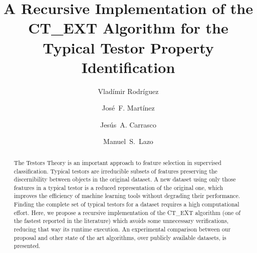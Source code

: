 \documentclass[citeauthoryear]{llncs}
\begin{document}
\mainmatter              %
%
\title{A Recursive Implementation of the CT\_EXT Algorithm 
	   for the Typical Testor Property Identification}
%
			 
\author{Vlad\'{i}mir Rodr\'{i}guez \and Jos\'{e}~F. Mart\'{i}nez
		 \and Jes\'{u}s~A. Carrasco \and Manuel~S.~Lazo}
%
%
%


\maketitle              %

\begin{abstract}
	The Testors Theory is an important approach to feature selection 
	in supervised classification. Typical testors are irreducible subsets 
	of features preserving the discernibility between objects in the 
	original dataset. A new dataset using only those features in a 
	typical testor is a reduced representation of the original one,
	which improves the efficiency of machine learning tools without 
	degrading their performance. Finding the complete set of typical 
	testors for 	a dataset requires a high computational effort. Here, 
	we propose a recursive implementation of the CT\_EXT algorithm 
	(one of the fastest reported in the literature) which avoids some 
	unnecessary verifications, reducing that way its runtime execution. 
	An experimental comparison between our proposal and other state of 
	the art algorithms, over publicly available datasets, is presented.
\end{abstract}
%
\end{document}
